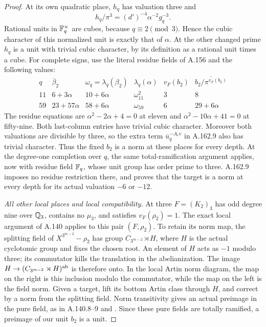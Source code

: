 \begin{proof}
At its own quadratic place, \(h_q\) has valuation three and
\[
             h_q/\pi^3=(d')^{-4}\alpha^{-2}g_q^{-3}.
\tag{A.162.10}
\]
Rational units in \(\mathbb F_q^\times\) are cubes, because
\(q\equiv2\pmod3\).  Hence the cubic character of this normalized
unit is exactly that of \(\alpha\).
At the other changed prime \(h_q\) is a unit with trivial cubic
character, by its definition as a rational unit times a cube.
For complete signs, use the literal residue fields of A.156 and the
following values:
\[
\begin{array}{c|c|c|c|c|c}
q&\overline\beta_2&\omega_q=\lambda_q(\beta_2)
 &\lambda_q(\alpha)&v_F(b_2)&\overline{b_2/\pi^{v_F(b_2)}}\\\hline
11&6+3\alpha&10+6\alpha&\omega_{11}^{2}&3&8\\
59&23+57\alpha&58+6\alpha&\omega_{59}&6&29+6\alpha
\end{array}
\tag{A.162.11}
\]
The residue equations are \(\alpha^2-2\alpha+4=0\) at eleven and
\(\alpha^2-10\alpha+41=0\) at fifty-nine.
Both last-column entries have trivial cubic character.
Moreover both valuations are divisible by three, so the extra term
\(\overline u_q^{-A_ev}\) in A.162.9 also has trivial character.
Thus the fixed \(b_2\) is a norm at these places for every depth.
At the degree-one completion over \(q\), the same total-ramification
argument applies, now with residue field \(\mathbb F_q\), whose unit group
has order prime to three.  A.162.9 imposes no residue restriction there,
and proves that the target is a norm at every depth for its actual
valuation \(-6\) or \(-12\).

\emph{All other local places and local compatibility.}
At three \(F=(K_2)_3\) has odd degree nine over \(\mathbb Q_3\), contains
no \(\mu_3\), and satisfies \(v_F(\rho_2)=1\).
The exact local argument of A.140 applies to this pair \((F,\rho_2)\).
To retain its norm map, the splitting field of
\(X^{3^{m-2}}-\rho_2\) has group \(C_{3^{m-2}}\rtimes H\),
where \(H\) is the actual cyclotomic group and fixes the chosen root.
An element of \(H\) acts as \(-1\) modulo three; its commutator
kills the translation in the abelianization.  The image
\(H\to(C_{3^{m-2}}\rtimes H)^{\rm ab}\) is therefore onto.
In the local Artin norm diagram, the map on the right is this inclusion
modulo the commutator, while the map on the left is the field norm.
Given a target, lift its bottom Artin class through \(H\), and correct
by a norm from the splitting field.  Norm transitivity gives an actual
preimage in the pure field, as in A.140.8--9 and
\cite[III, Theorem 3.5]{MilneCFT}.
Since these pure fields are totally ramified, a preimage of our unit
\(b_2\) is a unit.


\end{proof}
